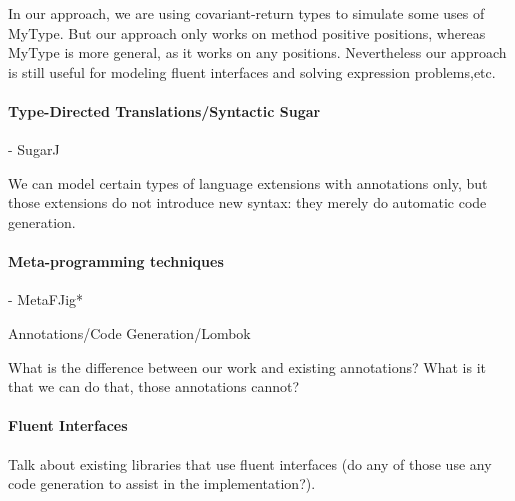 In our approach, we are using covariant-return types to simulate some uses of
MyType. But our approach only works on method positive positions, whereas MyType
is more general, as it works on any positions. Nevertheless our approach is
still useful for modeling fluent interfaces and solving expression
problems,etc. 

\paragraph{Type-Directed Translations/Syntactic Sugar}

- SugarJ~\cite{erdweg11sugarj}

We can model certain types of language extensions with annotations 
only, but those extensions do not introduce new syntax: they 
merely do automatic code generation. 

\paragraph{Meta-programming techniques}
- MetaFJig*

Annotations/Code Generation/Lombok

What is the difference between our work and existing annotations? 
What is it that we can do that, those annotations cannot?

\paragraph{Fluent Interfaces}

Talk about existing libraries that use fluent interfaces (do any of 
those use any code generation to assist in the implementation?). 



